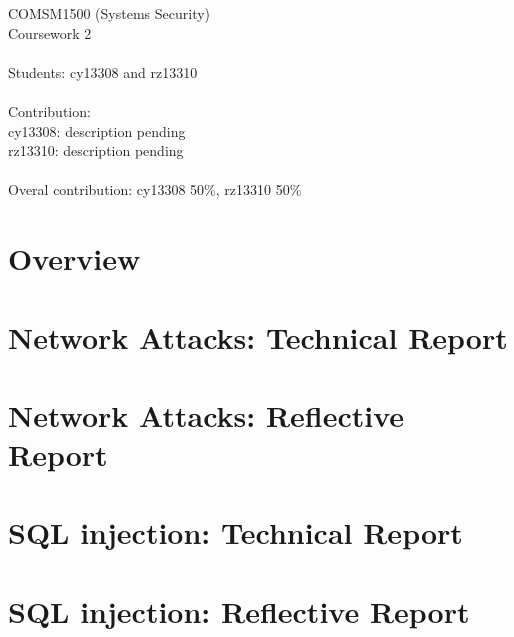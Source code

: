 \documentclass[11pt, onecolumn]{article}
\newcommand\tab[1][1cm]{\hspace*{#1}}
\begin{document}
COMSM1500 (Systems Security)\\
Coursework 2\\
\\
Students: cy13308 and rz13310 \\
\\
Contribution: \\
\tab[1cm] cy13308: description pending\\
\tab[1cm] rz13310: description pending
\\
\\
Overal contribution: cy13308 50\%, rz13310 50\%
\newpage


\section{Overview}


\newpage
\section{Network Attacks: Technical Report}


\newpage
\section{Network Attacks: Reflective Report}


\newpage
\section{SQL injection: Technical Report}


\newpage
\section{SQL injection: Reflective Report}



\newpage
{}

\end{document}
